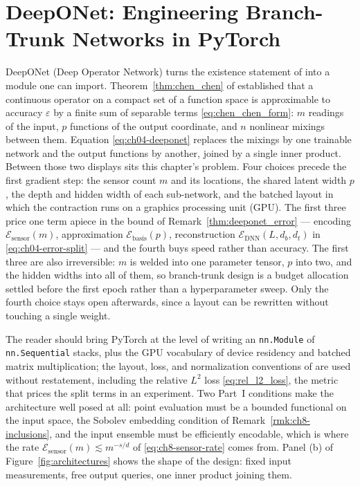 
\chapter{DeepONet: Engineering Branch-Trunk Networks in PyTorch}
\label{ch:part2-deeponet-engineering-branch-trunk-networks}
\label{sec:deeponet_impl}

DeepONet (Deep Operator Network) \cite{lu2021learning} turns the existence statement of
 into a module one can import.
Theorem~\ref{thm:chen_chen} of \cite{chen1995universal} established that a continuous operator
on a compact set of a function space is approximable to accuracy $\varepsilon$ by a finite sum
of separable terms \eqref{eq:chen_chen_form}: $m$ readings of the input, $p$ functions of the
output coordinate, and $n$ nonlinear mixings between them. Equation \eqref{eq:ch04-deeponet}
replaces the mixings by one trainable network and the output functions by another, joined by a
single inner product. Between those two displays sits this chapter's problem. Four choices
precede the first gradient step: the sensor count $m$ and its locations, the shared latent
width $p$, the depth and hidden width of each sub-network, and the batched layout in which the
contraction runs on a graphics processing unit (GPU). The first three price one term apiece in
the bound of Remark~\ref{thm:deeponet_error} --- encoding
$\mathcal{E}_{\text{sensor}}(m)$, approximation $\mathcal{E}_{\text{basis}}(p)$, reconstruction
$\mathcal{E}_{\text{DNN}}(L, d_b, d_t)$ in \eqref{eq:ch04-error-split} --- and the fourth buys speed
rather than accuracy. The first three are also irreversible: $m$ is welded into one parameter
tensor, $p$ into two, and the hidden widths into all of them, so branch-trunk design is a
budget allocation settled before the first epoch rather than a hyperparameter sweep. Only the
fourth choice stays open afterwards, since a layout can be rewritten without touching a single
weight.

The reader should bring PyTorch \cite{paszke2019pytorch} at the level of writing an
\texttt{nn.Module} of \texttt{nn.Sequential} stacks, plus the GPU vocabulary of device
residency and batched matrix multiplication; the layout, loss, and normalization conventions of
 are used without restatement,
including the relative $L^{2}$ loss \eqref{eq:rel_l2_loss}, the metric that prices
the split terms in an experiment. Two Part~I conditions make the architecture
well posed at all: point evaluation must be a bounded functional on the input space, the
Sobolev embedding condition of Remark~\ref{rmk:ch8-inclusions}, and the input ensemble must be
efficiently encodable, which is where the rate $\mathcal{E}_{\text{sensor}}(m)\lesssim m^{-s/d}$
of \eqref{eq:ch8-sensor-rate} comes from. Panel (b) of Figure~\ref{fig:architectures} shows the
shape of the design: fixed input measurements, free output queries, one inner product joining
them.

